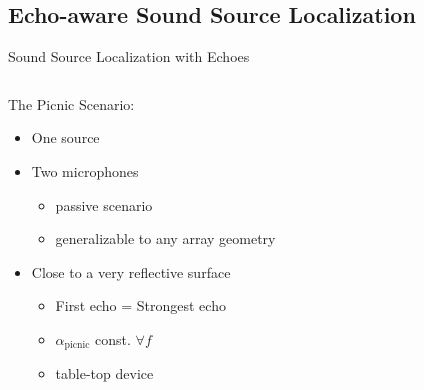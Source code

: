 \subsection{Echo-aware Sound Source Localization}

\begin{frame}[t]{Sound Source Localization \alert{with Echoes} \hfill\faMapMarked*}

    \vspace*{2mm}
    \begin{columns}[T,onlytextwidth]

        \begin{column}{0.5\textwidth}
            \begin{block}{The \alert{Picnic} Scenario:}
                \begin{itemize}
                    \small
                    \item<1-> One source
                    \item<1-> Two microphones
                    \begin{itemize}
                        \item<1->[$\rightarrow$] passive scenario
                        \item<1->[$\rightarrow$] generalizable to any array geometry
                    \end{itemize}
                    \item<2-> Close to a very reflective surface
                    \begin{itemize}
                        \item<2->[$\rightarrow$] First echo = Strongest echo
                        \item<2->[$\rightarrow$] $\alpha_\text{picnic}$ const. $\forall f$
                        \item<2->[$\rightarrow$] table-top device
                    \end{itemize}
                \end{itemize}
            \end{block}
        \end{column}

        \begin{column}{0.5\textwidth}
            \centering
        \end{column}
    \end{columns}


\end{frame}
